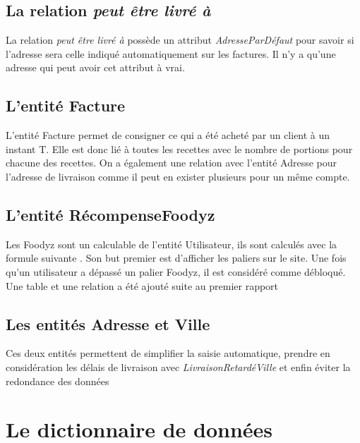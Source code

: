 \documentclass{article}
\begin{document}
\subsection{La relation \textit{peut être livré à}}
La relation \textit{peut être livré à} possède un attribut \textit{AdresseParDéfaut} pour savoir si l'adresse sera celle indiqué automatiquement sur les factures. Il n'y a qu'une adresse qui peut avoir cet attribut à vrai.

\subsection{L'entité Facture}
L'entité Facture permet de consigner ce qui a été acheté par un client à un instant T. Elle est donc lié à toutes les recettes avec le nombre de portions pour chacune des recettes. On a également une relation avec l'entité Adresse pour l'adresse de livraison comme il peut en exister plusieurs pour un même compte.

\subsection{L'entité RécompenseFoodyz}
Les Foodyz sont un calculable de l'entité Utilisateur, ils sont calculés avec la formule suivante . Son but premier est d'afficher les paliers sur le site. Une fois qu'un utilisateur a dépassé un palier Foodyz, il est considéré comme débloqué. {\color{ups}Une table et une relation a été ajouté suite au premier rapport}

\subsection{Les entités Adresse et Ville}
Ces deux entités permettent de simplifier la saisie automatique, prendre en considération les délais de livraison avec \textit{LivraisonRetardéVille} et enfin éviter la redondance des données

\section{Le dictionnaire de données}
\end{document}

